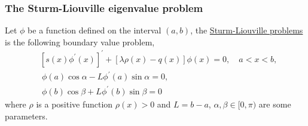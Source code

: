 




\subsubsection{The Sturm-Liouville eigenvalue problem}\label{sec.Sturm_Liouville}

\begin{definition}
Let $\phi$ be a function defined on the interval $(a, b)$, the \underline{Sturm-Liouville problems} is the following boundary value problem,
\begin{equation}\label{eq.Sturm_Liouville}
    \begin{split}
        &\left[s(x) \phi^{\prime}(x)\right]^{\prime}+[\lambda \rho(x)-q(x)] \phi(x)=0, \quad a<x<b,
        \\
        &\ \phi(a) \cos \alpha-L \phi^{\prime}(a) \sin \alpha=0,
        \\
        &\ \phi(b) \cos \beta+L \phi^{\prime}(b) \sin \beta=0
    \end{split}
\end{equation}
where $\rho$ is a positive function $\rho(x)>0$ and $L=b-a$, $\alpha, \beta \in[0, \pi)$ are some parameters. 
\end{definition}

